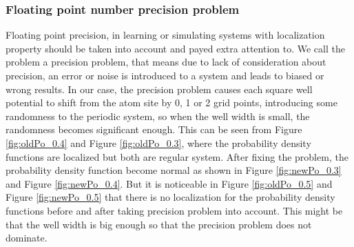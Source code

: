 \subsubsection{Floating point number precision problem}
Floating point precision, in learning or simulating systems with localization property should be taken into account and payed extra attention to. We call the problem  a precision problem, that means due to lack of consideration about precision, an error or noise is introduced to a system and leads to biased or wrong results. In our case, the precision problem causes each square well potential to shift from the atom site by 0, 1 or 2 grid points, introducing some randomness to the periodic system, so when the well width is small, the randomness becomes significant enough. This can be seen from Figure \ref{fig:oldPo_0.4} and Figure \ref{fig:oldPo_0.3}, where the probability density functions are localized but both are regular system. After fixing the problem, the probability density function become normal as shown in Figure \ref{fig:newPo_0.3} and Figure \ref{fig:newPo_0.4}. But it is noticeable  in Figure \ref{fig:oldPo_0.5} and Figure \ref{fig:newPo_0.5} that there is no localization for the probability density functions before and after taking precision problem into account. This might be that the well width is big enough so that the precision problem does not dominate. 

